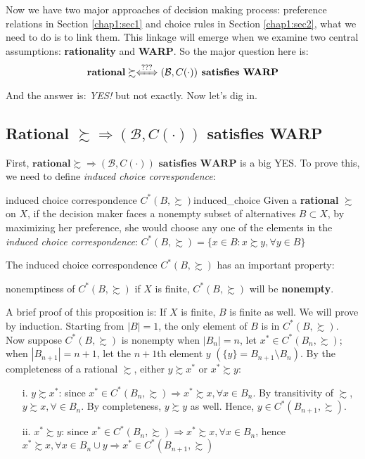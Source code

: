 Now we have two major approaches of decision making process: preference relations in Section \ref{chap1:sec1} and choice rules in Section \ref{chap1:sec2},
what we need to do is to link them. This linkage will emerge when we examine two central assumptions: \textbf{rationality} and \textbf{WARP}. So the major question here is: 
$$\textbf{rational}\succsim\xLeftrightarrow{???} (\mathcal{B},C(\cdot))\textbf{ satisfies WARP}$$
And the answer is: \textit{YES!} but not exactly. Now let's dig in.

\subsection*{Rational $\succsim\Rightarrow(\mathcal{B},C(\cdot))$ satisfies WARP}

First, $\textbf{rational}\succsim \Rightarrow (\mathcal{B},C(\cdot))\textbf{ satisfies WARP}$ is a big YES. To prove this, we need to define \textit{induced choice correspondence}:
\begin{definition}{induced choice correspondence $C^*(B,\succsim)$}{induced_choice}
    Given a \textbf{rational} $\succsim$ on $X$, if the decision maker faces a nonempty subset of alternatives $B\subset X$, by maximizing her preference, she would choose any one of the elements in the 
    \textit{induced choice correspondence}: $C^*(B,\succsim)=\{x\in B:x\succsim y, \forall y\in B\}$
\end{definition}

The induced choice correspondence $C^*(B,\succsim)$ has an important property: 
\begin{theorem}{nonemptiness of $C^*(B,\succsim)$}{}
    if $X$ is finite, $C^*(B,\succsim)$ will be \textbf{nonempty}.
\end{theorem}

A brief proof of this proposition is: If $X$ is finite, $B$ is finite as well. We will prove by induction. Starting from $|B|=1$, the only element of $B$ is in $C^*(B,\succsim)$. Now suppose $C^*(B,\succsim)$ is nonempty when $|B_n|=n$, 
let $x^*\in C^*(B_n,\succsim)$; when $|B_{n+1}|=n+1$, let the $n+1$th element $y$ $(\{y\}=B_{n+1}\setminus B_n)$. By the completeness of a rational $\succsim$, either $y\succsim x^*$ or $x^*\succsim y$:
\begin{enumerate}
    \item[i.] $y\succsim x^*$: since $x^*\in C^*(B_n,\succsim)\Rightarrow x^*\succsim x, \forall x\in B_n$. By transitivity of $\succsim$, $y\succsim x,\forall\in B_n$. By completeness, $y\succsim y$ as well. Hence, $y\in C^*(B_{n+1},\succsim)$.
    \item[ii.] $x^*\succsim y$: since $x^*\in C^*(B_n,\succsim)\Rightarrow x^*\succsim x, \forall x\in B_n$, hence $x^*\succsim x, \forall x\in B_n\cup{y}\Rightarrow x^*\in C^*(B_{n+1},\succsim)$
\end{enumerate}

